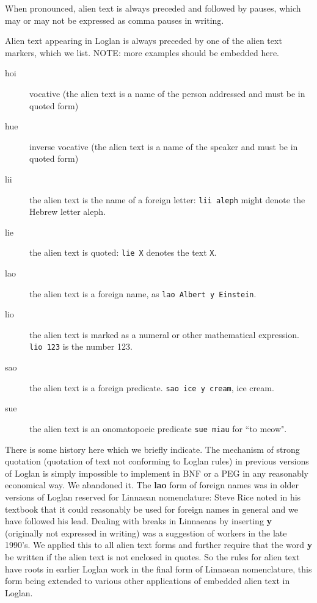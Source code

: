 \documentclass{article}
\begin{document}
When pronounced, alien text is always preceded and followed by pauses, which may or may not be expressed as comma pauses in writing.

Alien text appearing in Loglan is always preceded by one of the alien text markers, which we list.  NOTE:  more examples should be embedded here.

\begin{description}

\item[hoi]  vocative (the alien text is a name of the person addressed and must be in quoted form)

\item[hue] inverse vocative (the alien text is a name of the speaker and must be in quoted form)

\item[lii]  the alien text is the name of a foreign letter:  {\tt lii aleph} might denote the Hebrew letter aleph.

\item[lie] the alien text is quoted:  {\tt lie X} denotes the text {\tt X}.

\item[lao]  the alien text is a foreign name, as {\tt lao Albert y Einstein}.

\item[lio]  the alien text is marked as a numeral or other mathematical expression.  {\tt lio 123} is the number 123.

\item[sao]  the alien text is a foreign predicate.  {\tt sao ice y cream}, ice cream.

\item[sue]  the alien text is an onomatopoeic predicate {\tt sue miau} for ``to meow".


\end{description}

There is some history here which we briefly indicate.  The mechanism of strong quotation (quotation of text not conforming to Loglan rules) in previous versions of Loglan
is simply impossible to implement in BNF or a PEG in any reasonably economical way.  We abandoned it.  The {\bf lao} form of foreign names was in older versions of Loglan
reserved for Linnaean nomenclature:  Steve Rice noted in his textbook that it could reasonably be used for foreign names in general and we have followed his lead.
Dealing with breaks in Linnaeans by inserting {\bf y} (originally not expressed in writing) was a suggestion of workers in the late 1990's.  We applied this to all alien text forms
and further require that the word {\bf y} be written if the alien text is not enclosed in quotes.  So the rules for alien text have roots in earlier Loglan work in the final form
of Linnaean nomenclature, this form being extended to various other applications of embedded alien text in Loglan.
\end{document}
